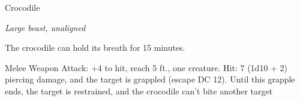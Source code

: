 \begin{monsterbox}{Crocodile}
\begin{hangingpar}
\textit{Large beast, unaligned}
\end{hangingpar}
\dndline%
\basics[%
armorclass = 12,
hitpoints = 3d10 + 3,
speed = {20 ft., swim 20 ft.}
]
\dndline%
\stats[%
STR = \stat{15},
DEX = \stat{10},
CON = \stat{13},
INT = \stat{2},
WIS = \stat{10},
CHA = \stat{5}
]
\dndline%
\details[%
skills={Stealth +2, },
damageimmunities={},
savingthrows={},
conditionimmunities={},
damageresistances={},
damagevulnerabilities={},
senses={passive Perception 10},
challenge=1/2
]
\dndline%
\begin{monsteraction}
The crocodile can hold its breath for 15 minutes.
\end{monsteraction}
\begin{monsteraction}[Bite]
Melee Weapon Attack: +4 to hit, reach 5 ft., one creature. Hit: 7 (1d10 + 2) piercing damage, and the target is grappled (escape DC 12). Until this grapple ends, the target is restrained, and the crocodile can't bite another target
\end{monsteraction}
\end{monsterbox}